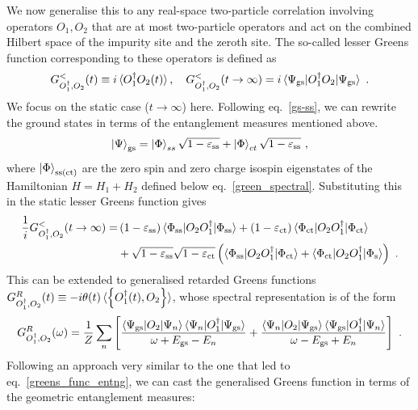 \documentclass{iopart}
\begin{document}
We now generalise this to any real-space two-particle correlation involving operators \(O_1, O_2\) that are at most two-particle operators and act on the combined Hilbert space of the impurity site and the zeroth site. The so-called lesser Greens function corresponding to these operators is defined as 
\begin{eqnarray}\label{lesser-gf}
	G^<_{O_1^\dagger, O_2}(t) \equiv i\braket{O_1^\dagger O_2(t)}, \quad G^<_{O_1^\dagger, O_2}(t\to \infty) = i\braket{\Psi_\text{gs}|O_1^\dagger O_2 | \Psi_\text{gs}} ~.
\end{eqnarray}
We focus on the static case (\(t \to \infty\)) here. Following eq.~\eqref{gs-ss}, we can rewrite the ground states in terms of the entanglement measures mentioned above.
\begin{eqnarray}
	\ket{\Psi}_\text{gs} = \ket{\Phi}_{ss}\sqrt{1 - \varepsilon_\text{ss}} + \ket{\Phi}_{ct}\sqrt{1 - \varepsilon_\text{ss}}~,
\end{eqnarray}
where \(\ket{\Phi}_\text{ss(ct)}\) are the zero spin and zero charge isospin eigenstates of the Hamiltonian \(H = H_1 + H_2\) defined below eq.~\eqref{green_spectral}.
Substituting this in the static lesser Greens function gives
\begin{eqnarray}
	\label{gen-entng}
	\frac{1}{i}G^<_{O_1^\dagger, O_2}(t\to \infty) =& \left(1 - \varepsilon_\text{ss}\right) \braket{\Phi_\text{ss} | O_2 O_1^\dagger | \Phi_\text{ss}} + \left(1 - \varepsilon_\text{ct}\right) \braket{\Phi_\text{ct} | O_2 O_1^\dagger | \Phi_\text{ct}} \nonumber \\
				      &+ \sqrt{1 - \varepsilon_\text{ss}}\sqrt{1 - \varepsilon_\text{ct}}\left(\braket{\Phi_\text{ss} | O_2 O_1^\dagger | \Phi_\text{ct}} + \braket{\Phi_\text{ct} | O_2 O_1^\dagger | \Phi_\text{s}}\right)~.
\end{eqnarray}
This can be extended to generalised retarded Greens functions \(G^R_{O_1^\dagger,O_2}(t) \equiv -i\theta(t) \braket{\left\{O_1^\dagger(t), O_2\right\}}\), whose spectral representation is of the form
\begin{eqnarray}
	\label{retarded}
	G^R_{O_1^\dagger,O_2}(\omega) = \frac{1}{Z}\sum_n \left[ \frac{\braket{\Psi_\text{gs} | O_2 | \Psi_n}\braket{\Psi_n | O_1^\dagger | \Psi_\text{gs}}}{\omega + E_\text{gs} - E_n} + \frac{\braket{\Psi_n | O_2 | \Psi_\text{gs}}\braket{\Psi_\text{gs} | O_1^\dagger | \Psi_n}}{\omega - E_\text{gs} + E_n}\right] ~.
\end{eqnarray}
Following an approach very similar to the one that led to eq.~\eqref{greens_func_entng}, we can cast the generalised Greens function in terms of the geometric entanglement measures:
\end{document}

